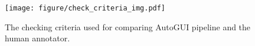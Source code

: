 \begin{figure}[t]
    \centering
    \texttt{[image: figure/check\_criteria\_img.pdf]}
    \caption{The checking criteria used for comparing AutoGUI pipeline and the human annotator.}
    \label{fig: check criteria}
\end{figure}
